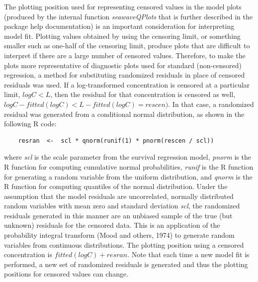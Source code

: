\documentclass[11pt]{article}
\begin{document}
\vspace{5 mm}

The plotting position used for representing censored values in the model plots (produced by the internal function \textit{seawaveQPlots} that is further described in the package help documentation) is an important consideration for interpreting model fit.  Plotting values obtained by using the censoring limit, or something smaller such as one-half of the censoring limit, produce plots that are difficult to interpret if there are a large number of censored values.  Therefore, to make the plots more representative of diagnostic plots used for standard (non-censored) regression,  a method for substituting randomized residuals in place of censored residuals was used.   If a log-transformed concentration is censored at a particular limit, $logC < L$, then the residual for that concentration is censored as well, $logC - fitted(logC) < L - fitted(logC) = rescen)$.  In that case, a randomized residual was generated from a conditional normal distribution, as shown in the following R code:
\begin{verbatim}
	resran  <-  scl * qnorm(runif(1) * pnorm(rescen / scl))
\end{verbatim}
where \textit{scl} is the scale parameter from the survival regression model, \textit{pnorm} is the R function for computing cumulative normal probabilities, \textit{runif} is the R function for generating a random variable from the uniform distribution, and \textit{qnorm} is the R function for computing quantiles of the normal distribution.  Under the assumption that the model residuals are uncorrelated, normally distributed random variables with mean zero and standard deviation \textit{scl}, the randomized residuals generated in this manner are an unbiased sample of the true (but unknown) residuals for the censored data.  This is an application of the probability integral transform (Mood and others, 1974) to generate random variables from continuous distributions.  The plotting position using a censored concentration is $fitted(logC) + resran$.  Note that each time a new model fit is performed, a new set of randomized residuals is generated and thus the plotting positions for censored values can change.
\end{document}
